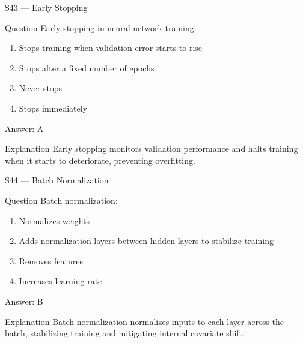 \documentclass[aspectratio=169,8pt]{beamer}
\begin{document}
	\begin{frame}{S43 --- Early Stopping}
		\begin{block}{Question}
			Early stopping in neural network training:
			\begin{enumerate}
				\item Stops training when validation error starts to rise
				\item Stops after a fixed number of epochs
				\item Never stops
				\item Stops immediately
			\end{enumerate}
		\end{block}
		\begin{exampleblock}{Answer: A}\end{exampleblock}
		\begin{block}{Explanation}
			Early stopping monitors validation performance and halts training when it starts to deteriorate, preventing overfitting.
		\end{block}
	\end{frame}
	
	\begin{frame}{S44 --- Batch Normalization}
		\begin{block}{Question}
			Batch normalization:
			\begin{enumerate}
				\item Normalizes weights
				\item Adds normalization layers between hidden layers to stabilize training
				\item Removes features
				\item Increases learning rate
			\end{enumerate}
		\end{block}
		\begin{exampleblock}{Answer: B}\end{exampleblock}
		\begin{block}{Explanation}
			Batch normalization normalizes inputs to each layer across the batch, stabilizing training and mitigating internal covariate shift.
		\end{block}
	\end{frame}
	
\end{document}
